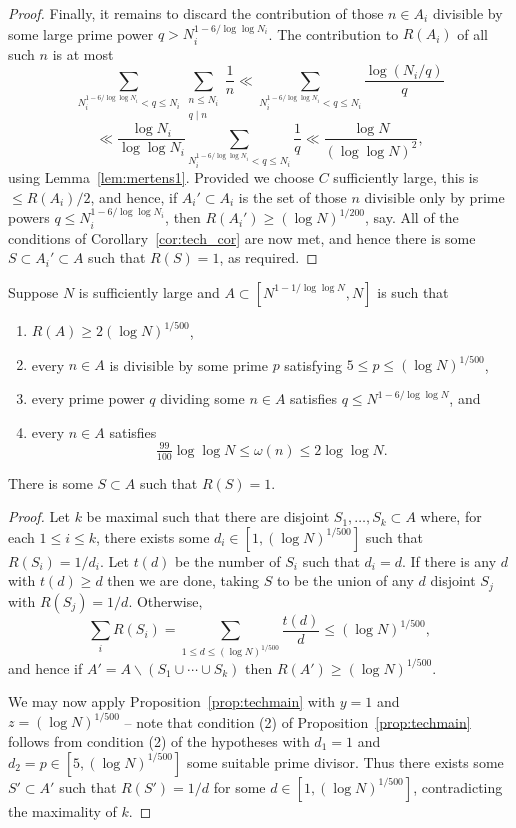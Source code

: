 \begin{proof}
  Finally, it remains to discard the contribution of those $n\in A_i$ divisible by some large prime power $q> N_i^{1-6/\log\log N_i}$. The contribution to $R(A_i)$ of all such $n$ is at most
\[
  \sum_{N_i^{1-6/\log\log N_i}< q\leq N_i}\sum_{\substack{n\leq N_i\\ q\mid n}}\frac{1}{n}
  \ll \sum_{N_i^{1-6/\log\log N_i}< q\leq N_i}\frac{\log(N_i/q)}{q}\]
  \[\ll \frac{\log N_i}{\log\log N_i}\sum_{N_i^{1-6/\log\log N_i}<q\leq N_i}\frac{1}{q}\ll \frac{\log N}{(\log\log N)^2},\]
  using Lemma~\ref{lem:mertens1}. Provided we choose $C$ sufficiently large, this is $\leq R(A_i)/2$, and hence, if $A_i'\subset A_i$ is the set of those $n$ divisible only by prime powers $q\leq N_i^{1-6/\log\log N_i}$, then $R(A_i')\geq (\log N)^{1/200}$, say. All of the conditions of Corollary~\ref{cor:tech_cor} are now met, and hence there is some $S\subset A_i'\subset A$ such that $R(S)=1$, as required.
\end{proof}


\begin{corollary}\label{cor:tech_cor}
  \leanok
  Suppose $N$ is sufficiently large and $A\subset [N^{1-1/\log\log N},N]$ is such that
  \begin{enumerate}
  \item $R(A)\geq 2(\log N)^{1/500}$,
  \item every $n\in A$ is divisible by some prime $p$ satisfying $5 \leq p \leq (\log N)^{1/500}$,
  \item every prime power $q$ dividing some $n\in A$ satisfies $q\leq N^{1-6/\log\log N}$, and
  \item every $n\in A$ satisfies
  \[\tfrac{99}{100}\log\log N\leq \omega(n) \leq 2\log\log N.\]
  \end{enumerate}
  There is some $S\subset A$ such that $R(S)=1$.
\end{corollary}
\begin{proof}
  \leanok
  Let $k$ be maximal such that there are disjoint $S_1,\ldots,S_k\subset A$ where, for each $1\leq i\leq k$, there exists some $d_i\in [1,(\log N)^{1/500}]$ such that $R(S_i)=1/d_i$. Let $t(d)$ be the number of $S_i$ such that $d_i=d$. If there is any $d$ with $t(d)\geq d$ then we are done, taking $S$ to be the union of any $d$ disjoint $S_j$ with $R(S_j)=1/d$. Otherwise,
  \[\sum_i R(S_i)= \sum_{1\leq d\leq (\log N)^{1/500}} \frac{t(d)}{d}\leq (\log N)^{1/500},\]
  and hence if $A'=A\backslash (S_1\cup\cdots \cup S_k)$ then $R(A')\geq (\log N)^{1/500}$.

  We may now apply Proposition~\ref{prop:techmain} with $y=1$ and $z=(\log N)^{1/500}$ -- note that condition (2) of Proposition~\ref{prop:techmain} follows from condition (2) of the hypotheses with $d_1=1$ and $d_2=p\in [5,(\log N)^{1/500}]$ some suitable prime divisor. Thus there exists some $S'\subset A'$ such that $R(S')=1/d$ for some $d\in [1,(\log N)^{1/500}]$, contradicting the maximality of $k$.
\end{proof}

